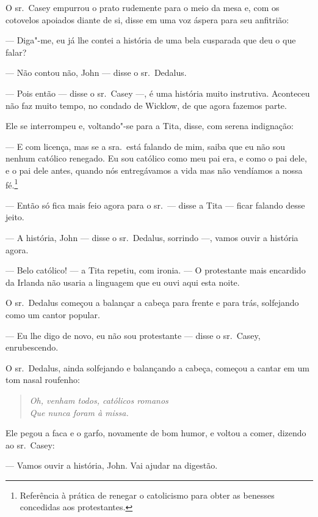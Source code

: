 O sr.~Casey empurrou o prato rudemente para o meio da mesa e, com os
cotovelos apoiados diante de si, disse em uma voz áspera para seu
anfitrião:

 --- Diga"-me, eu já lhe contei a história de uma bela cusparada que deu o que falar?

 --- Não contou não, John --- disse o sr.~Dedalus.

 --- Pois então --- disse o sr.~Casey ---, é uma história muito instrutiva. Aconteceu não faz muito tempo, no condado de Wicklow, de que agora fazemos parte.

Ele se interrompeu e, voltando"-se para a Tita, disse, com serena
indignação:

 --- E com licença, mas se a sra.~está falando de mim, saiba que eu não sou nenhum católico renegado. Eu sou católico como meu pai era, e como o
pai dele, e o pai dele antes, quando nós entregávamos a vida mas não
vendíamos a nossa fé.\footnote{ Referência à prática de renegar o
catolicismo para obter as benesses concedidas aos protestantes.}

 --- Então só fica mais feio agora para o sr.~--- disse a Tita --- ficar falando desse jeito.

 --- A história, John --- disse o sr.~Dedalus, sorrindo ---, vamos ouvir a
história agora.

 --- Belo católico! --- a Tita repetiu, com ironia. --- O protestante mais
encardido da Irlanda não usaria a linguagem que eu ouvi aqui esta
noite.

O sr.~Dedalus começou a balançar a cabeça para frente e para trás,
solfejando como um cantor popular.

 --- Eu lhe digo de novo, eu não sou protestante --- disse o sr.~Casey, enrubescendo.

O sr.~Dedalus, ainda solfejando e balançando a cabeça, começou a cantar
em um tom nasal roufenho:

\begin{verse}\itshape
Oh, venham todos, católicos romanos\\  
Que nunca foram à missa.
\end{verse}


Ele pegou a faca e o garfo, novamente de bom humor, e voltou a comer,
dizendo ao sr.~Casey:

 --- Vamos ouvir a história, John. Vai ajudar na digestão.


